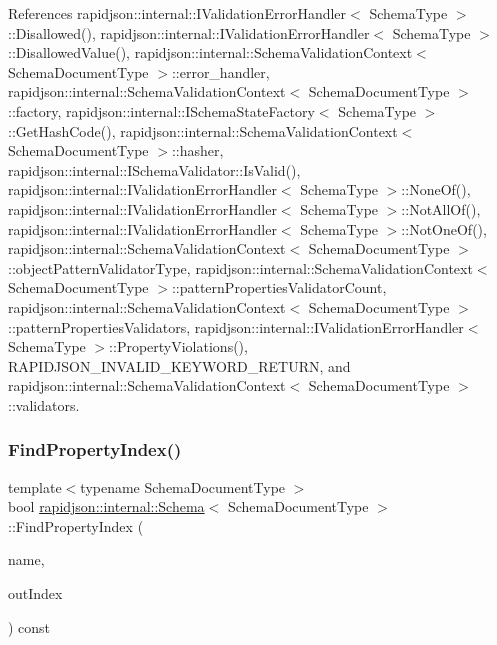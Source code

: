 References rapidjson\+::internal\+::\+I\+Validation\+Error\+Handler$<$ Schema\+Type $>$\+::\+Disallowed(), rapidjson\+::internal\+::\+I\+Validation\+Error\+Handler$<$ Schema\+Type $>$\+::\+Disallowed\+Value(), rapidjson\+::internal\+::\+Schema\+Validation\+Context$<$ Schema\+Document\+Type $>$\+::error\+\_\+handler, rapidjson\+::internal\+::\+Schema\+Validation\+Context$<$ Schema\+Document\+Type $>$\+::factory, rapidjson\+::internal\+::\+I\+Schema\+State\+Factory$<$ Schema\+Type $>$\+::\+Get\+Hash\+Code(), rapidjson\+::internal\+::\+Schema\+Validation\+Context$<$ Schema\+Document\+Type $>$\+::hasher, rapidjson\+::internal\+::\+I\+Schema\+Validator\+::\+Is\+Valid(), rapidjson\+::internal\+::\+I\+Validation\+Error\+Handler$<$ Schema\+Type $>$\+::\+None\+Of(), rapidjson\+::internal\+::\+I\+Validation\+Error\+Handler$<$ Schema\+Type $>$\+::\+Not\+All\+Of(), rapidjson\+::internal\+::\+I\+Validation\+Error\+Handler$<$ Schema\+Type $>$\+::\+Not\+One\+Of(), rapidjson\+::internal\+::\+Schema\+Validation\+Context$<$ Schema\+Document\+Type $>$\+::object\+Pattern\+Validator\+Type, rapidjson\+::internal\+::\+Schema\+Validation\+Context$<$ Schema\+Document\+Type $>$\+::pattern\+Properties\+Validator\+Count, rapidjson\+::internal\+::\+Schema\+Validation\+Context$<$ Schema\+Document\+Type $>$\+::pattern\+Properties\+Validators, rapidjson\+::internal\+::\+I\+Validation\+Error\+Handler$<$ Schema\+Type $>$\+::\+Property\+Violations(), R\+A\+P\+I\+D\+J\+S\+O\+N\+\_\+\+I\+N\+V\+A\+L\+I\+D\+\_\+\+K\+E\+Y\+W\+O\+R\+D\+\_\+\+R\+E\+T\+U\+RN, and rapidjson\+::internal\+::\+Schema\+Validation\+Context$<$ Schema\+Document\+Type $>$\+::validators.

\mbox{\label{classrapidjson_1_1internal_1_1_schema_a6ee8add5fcc29c44c6f51ce2e66a26b9}} 
\subsubsection{\texorpdfstring{FindPropertyIndex()}{FindPropertyIndex()}}
{\footnotesize\ttfamily template$<$typename Schema\+Document\+Type $>$ \\
bool \mbox{\hyperlink{classrapidjson_1_1internal_1_1_schema}{rapidjson\+::internal\+::\+Schema}}$<$ Schema\+Document\+Type $>$\+::Find\+Property\+Index (\begin{DoxyParamCaption}\item[{const \mbox{\hyperlink{classrapidjson_1_1internal_1_1_schema_a3979a9083c598195927c08c6e3ba91d1}{Value\+Type}} \&}]{name,  }\item[{\mbox{\hyperlink{namespacerapidjson_a44eb33eaa523e36d466b1ced64b85c84}{Size\+Type}} $\ast$}]{out\+Index }\end{DoxyParamCaption}) const\hspace{0.3cm}{\ttfamily [private]}}



